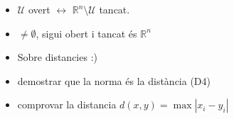 \documentclass{article}
\newcommand{\R}{\mathbb{R}}
\newcommand{\U}{\mathcal{U}}
\begin{document}
\begin{itemize}
\item $\U$ overt $\leftrightarrow$ $\R^n\setminus \U$ tancat.
\item $\neq \emptyset$, sigui obert i tancat és $\R^n$
\item Sobre distancies :)
\item demostrar que la norma és la distància (D4)
\item comprovar la distancia $d(x,y) = \max{|x_i-y_i|}$
\end{itemize}
\end{document}
